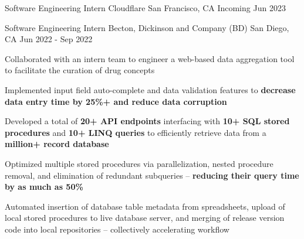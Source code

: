 

\begin{cventries}

  \cventry
  {Software Engineering Intern} %
  {Cloudflare} %
  {San Francisco, CA} %
  {Incoming Jun 2023} %
  {\begin{cvitems} %
    \end{cvitems}
  }

  \vspace{-1.5em}

  \cventry
  {Software Engineering Intern} %
  {Becton, Dickinson and Company (BD)} %
  {San Diego, CA} %
  {Jun 2022 - Sep 2022} %
  {\begin{cvitems} %
      \item {Collaborated with an intern team to engineer a web-based data aggregation tool to facilitate the curation of drug concepts}
      \item { Implemented input field auto-complete and data validation features to \textbf{decrease data entry time by 25\%+ and reduce data corruption} }
      \item {Developed a total of \textbf{20+ API endpoints} interfacing with \textbf{10+ SQL stored procedures} and \textbf{10+ LINQ queries} to efficiently retrieve data from a \textbf{million+ record database}}
      \item {Optimized multiple stored procedures via parallelization, nested procedure removal, and elimination of redundant subqueries -- \textbf{reducing their query time by as much as 50\%}}
      \item {Automated insertion of database table metadata from spreadsheets, upload of local stored procedures to live database server, and merging of release version code into local repositories -- collectively accelerating workflow}
    \end{cvitems}
  }


\end{cventries}
